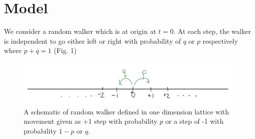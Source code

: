 \documentclass[showpacs,amsmath,amssymb,aps,pre,twocolumn]{revtex4-1}
\begin{document}
\section{Model}

We consider a random walker which is at origin at $t=0$. At each step, the walker is independent to go either left or right with probability of $q$ or $p$ respectively where $p+q=1$  (Fig. 1)
\begin{figure}[H]
    \centering
    \includegraphics[scale=0.45]{walker_schematic.png}
    \caption{A schematic of random walker defined in one dimension lattice with movement given as +1 step with probability $p$ or a step of -1 with probability $1-p$ or $q$.}
    \label{fig:my_label}
\end{figure}





\end{document}
